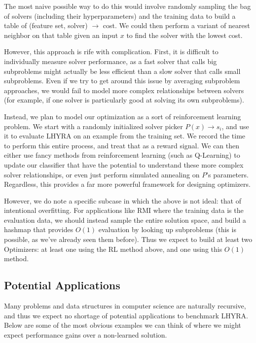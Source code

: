 \documentclass{article}
\begin{document}
The most naive possible way to do this would involve randomly sampling the bag of solvers (including their hyperparameters) and the training data to build a table of (feature set, solver) $\rightarrow$ cost. We could then perform a variant of nearest neighbor on that table given an input $x$ to find the solver with the lowest cost.

However, this approach is rife with complication. First, it is difficult to individually measure solver performance, as a fast solver that calls big subproblems might actually be less efficient than a slow solver that calls small subproblems. Even if we try to get around this issue by averaging subproblem approaches, we would fail to model more complex relationships between solvers (for example, if one solver is particularly good at solving its own subproblems). 

Instead, we plan to model our optimization as a sort of reinforcement learning problem.  We start with a randomly initialized solver picker $P(x) \rightarrow s_i$, and use it to evaluate LHYRA on an example from the training set.  We record the time to perform this entire process, and treat that as a reward signal.  We can then either use fancy methods from reinforcement learning (such as Q-Learning) to update our classifier that have the potential to understand these more complex solver relationships, or even just perform simulated annealing on $P$'s parameters.  Regardless, this provides a far more powerful framework for designing optimizers.

However, we do note a specific subcase in which the above is not ideal: that of intentional overfitting.  For applications like RMI where the training data is the evaluation data, we should instead sample the entire solution space, and build a hashmap that provides $O(1)$ evaluation by looking up subproblems (this is possible, as we’ve already seen them before).  Thus we expect to build at least two Optimizers: at least one using the RL method above, and one using this $O(1)$ method.

\subsection*{Potential Applications}

Many problems and data structures in computer science are naturally recursive, and thus we expect no shortage of potential applications to benchmark LHYRA. Below are some of the most obvious examples we can think of where we might expect performance gains over a non-learned solution.
\end{document}
